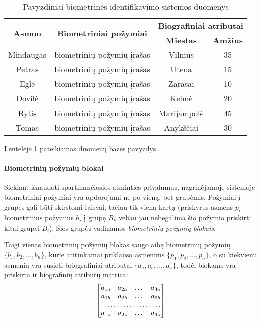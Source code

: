 \begin{table}[H]\footnotesize
	\centering
	\begin{tabular}{|c|c|c|c|}
		\hline
		\multirow{2}{*}{{\bf Asmuo}} & \multirow{2}{*}{{\bf Biometriniai požymiai}} & \multicolumn{2}{|c|}{{\bf Biografiniai atributai}}  \\ \cline{3-4}
		& & {\bf Miestas} & {\bf Amžius} \\
		\hline
		Mindaugas & biometrinių požymių įrašas & Vilnius & 35 \\ \cline{2-4}
		\hline
		Petras & biometrinių požymių įrašas & Utena & 15 \\ \cline{2-4}
		\hline
		Eglė & biometrinių požymių įrašas & Zarasai & 10 \\ \cline{2-4}
		\hline
		Dovilė & biometrinių požymių įrašas & Kelmė & 20 \\ \cline{2-4}
		\hline
		Rytis & biometrinių požymių įrašas & Marijampolė & 45 \\ \cline{2-4}
		\hline
		Tomas & biometrinių požymių įrašas & Anykščiai & 30 \\ \cline{2-4}
		\hline
	\end{tabular}
	\caption{Pavyzdiniai biometrinės identifikavimo sistemos duomenys}
	\label{tab:exampleGallery}
\end{table}

Lentelėje \ref{tab:exampleGallery} pateikiamas duomenų bazės pavyzdys.


\paragraph{Biometrinių požymių blokai}

Siekiant išnaudoti spartinančiosios atminties privalumus, nagrinėjamoje sistemoje biometriniai požymiai yra apdorojami ne po vieną, bet grupėmis.
Požymiai į grupes gali būti skirstomi laisvai, tačiau tik vieną kartą (priskyrus asmens $p_i$ biometrinius požymius $b_j$ į grupę $B_k$ veliau jau nebegalima šio požymio priskirti kitai grupei $B_l$).
Šios grupės vadinamos {\it biometrinių požymių blokais}.

Taigi vienas biometrinių požymių blokas saugo aibę biometrinių požymių $\{b_1, b_2, ..., b_n\}$, kurie atitinkamai priklauso asmenims $\{p_1, p_2, ..., p_n\}$, o su kiekvienu asmeniu yra susieti briografiniai atributai $\{a_a, a_b, ..., a_z\}$, todėl blokams yra priskirta ir biografinių atributų matrica:
\begin{equation}
\begin{bmatrix}
		a_{1a}       & a_{2a} & \dots & a_{3a} \\
		a_{1b}       & a_{2b} & \dots & a_{3b} \\
		\hdotsfor{4} \\
		a_{1z}       & a_{2z} & \dots & a_{3z}
	\end{bmatrix}
\end{equation}


